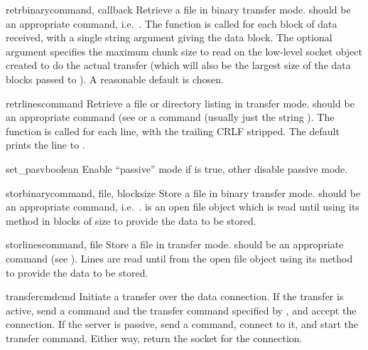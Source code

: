 \begin{methoddesc}{retrbinary}{command, callback}
Retrieve a file in binary transfer mode.   should be an
appropriate  command, i.e.\ .
The  function is called for each block of data received,
with a single string argument giving the data block.
The optional  argument specifies the maximum chunk size to
read on the low-level socket object created to do the actual transfer
(which will also be the largest size of the data blocks passed to
).  A reasonable default is chosen.
\end{methoddesc}

\begin{methoddesc}{retrlines}{command}
Retrieve a file or directory listing in \ASCII{} transfer mode.
 should be an appropriate  command (see
 or a  command (usually just the string
).  The  function is called for each line,
with the trailing CRLF stripped.  The default  prints
the line to .
\end{methoddesc}

\begin{methoddesc}{set_pasv}{boolean}
Enable ``passive'' mode if  is true, other disable
passive mode.
\end{methoddesc}

\begin{methoddesc}{storbinary}{command, file, blocksize}
Store a file in binary transfer mode.   should be an
appropriate  command, i.e.\ .
 is an open file object which is read until \EOF{} using its
 method in blocks of size  to provide the
data to be stored.
\end{methoddesc}

\begin{methoddesc}{storlines}{command, file}
Store a file in \ASCII{} transfer mode.   should be an
appropriate  command (see ).  Lines are
read until \EOF{} from the open file object  using its
 method to provide the data to be stored.
\end{methoddesc}

\begin{methoddesc}{transfercmd}{cmd}
Initiate a transfer over the data connection.  If the transfer is
active, send a  command and the transfer command specified
by , and accept the connection.  If the server is passive,
send a  command, connect to it, and start the transfer
command.  Either way, return the socket for the connection.
\end{methoddesc}

